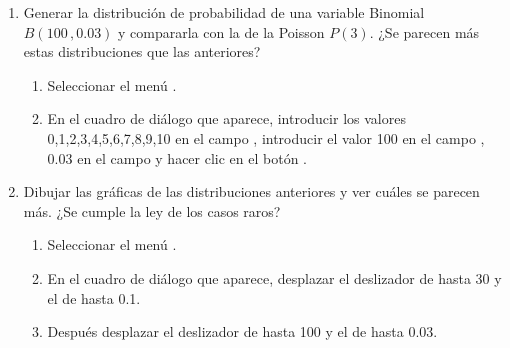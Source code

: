 \begin{enumerate}[leftmargin=*]
\begin{enumerate}
\item Generar la distribución de probabilidad de una variable Binomial $B(100\,,0.03)$ y compararla con la de la
Poisson $P(3)$. ¿Se parecen más estas distribuciones que las anteriores? 
\begin{indicacion}{
\begin{enumerate}
\item Seleccionar el menú .
\item En el cuadro de diálogo que aparece, introducir los valores 0,1,2,3,4,5,6,7,8,9,10 en el campo , introducir el valor 100 en el campo , $0.03$ en
el campo  y hacer clic en el botón .
\end{enumerate}}
\end{indicacion}

\item Dibujar las gráficas de las distribuciones anteriores y ver cuáles se parecen más. 
¿Se cumple la ley de los casos raros?
\begin{indicacion}{
\begin{enumerate}
\item Seleccionar el menú .
\item En el cuadro de diálogo que aparece, desplazar el deslizador de  hasta 30 y el de  hasta 0.1.
\item Después desplazar el deslizador de  hasta 100 y el de  hasta 0.03.
\end{enumerate}}
\end{indicacion}
\end{enumerate}
\end{enumerate}



